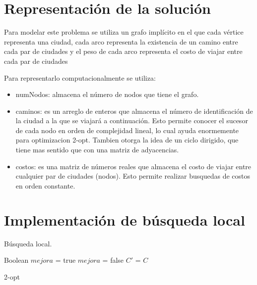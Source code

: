 \documentclass{ci5652}
\begin{document}
\section{Representación de la solución}
Para modelar este problema se utiliza un grafo implícito en el que cada vértice representa una ciudad, cada arco representa la existencia de un camino entre cada par de ciudades y el peso de cada arco representa el costo de viajar entre cada par de ciudades

Para representarlo computacionalmente se utiliza:
\begin{itemize}
\item numNodos: almacena el número de nodos que tiene el grafo.
\item caminos: es un arreglo de enteros que almacena el número de identificación de la ciudad a la que se viajará a continuación. Esto permite conocer el sucesor de cada nodo en orden de complejidad lineal, lo cual ayuda enormemente para optimizacion 2-opt.
Tambien otorga la idea de un ciclo dirigido, que tiene mas sentido que con una matriz de adyacencias.
\item costos: es una matriz de números reales que almacena el costo de viajar entre cualquier par de ciudades (nodos). Esto permite realizar busquedas de costos en orden constante.
\end{itemize}

\section{Implementación de búsqueda local}
Búsqueda local.

\begin{algorithm}
 \DontPrintSemicolon
 \vspace*{0.1cm}
 Boolean $mejora$ = true\;
  {
	$mejora$ = false\; 
	$C'$ = $C$\;
 }
 \vspace*{0.1cm}
 \caption{2-opt}
\end{algorithm}
\end{document}
